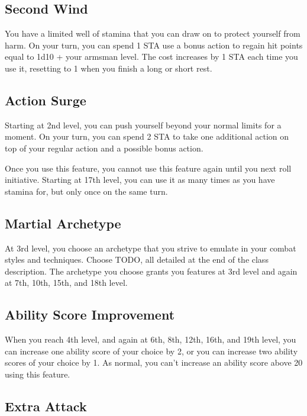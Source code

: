 \subsection{Second Wind}

You have a limited well of stamina that you can draw on to protect yourself from harm. On your turn, you can spend 1 STA use a bonus action to regain hit points equal to 1d10 + your armsman level. The cost increases by 1 STA each time you use it, resetting to 1 when you finish a long or short rest.

\subsection{Action Surge}

Starting at 2nd level, you can push yourself beyond your normal limits for a moment. On your turn, you can spend 2 STA to take one additional action on top of your regular action and a possible bonus action.

Once you use this feature, you cannot use this feature again until you next roll initiative. Starting at 17th level, you can use it as many times as you have stamina for, but only once on the same turn.

\subsection{Martial Archetype}

At 3rd level, you choose an archetype that you strive to emulate in your combat styles and techniques. Choose TODO, all detailed at the end of the class description. The archetype you choose grants you features at 3rd level and again at 7th, 10th, 15th, and 18th level.

\subsection{Ability Score Improvement}

When you reach 4th level, and again at 6th, 8th, 12th, 16th, and 19th level, you can increase one ability score of your choice by 2, or you can increase two ability scores of your choice by 1. As normal, you can’t increase an ability score above 20 using this feature.

\subsection{Extra Attack}

